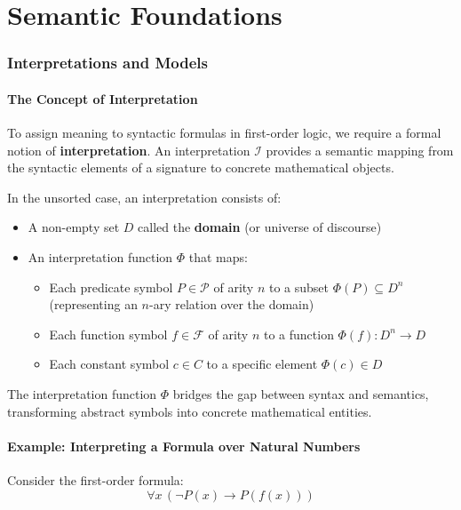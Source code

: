 \documentclass[11pt,a4paper]{article}
\theoremstyle{definition}
\theoremstyle{plain}
\theoremstyle{remark}
\begin{document}
\newpage

\part{Semantic Foundations}

\section{Interpretations and Models}

\subsection{The Concept of Interpretation}

To assign meaning to syntactic formulas in first-order logic, we require a formal notion of \textbf{interpretation}. An interpretation $\mathcal{I}$ provides a semantic mapping from the syntactic elements of a signature to concrete mathematical objects.

In the unsorted case, an interpretation consists of:
\begin{itemize}
    \item A non-empty set $D$ called the \textbf{domain} (or universe of discourse)
    \item An interpretation function $\Phi$ that maps:
    \begin{itemize}
        \item Each predicate symbol $P \in \mathcal{P}$ of arity $n$ to a subset $\Phi(P) \subseteq D^n$ (representing an $n$-ary relation over the domain)
        \item Each function symbol $f \in \mathcal{F}$ of arity $n$ to a function $\Phi(f) : D^n \rightarrow D$
        \item Each constant symbol $c \in C$ to a specific element $\Phi(c) \in D$
    \end{itemize}
\end{itemize}

The interpretation function $\Phi$ bridges the gap between syntax and semantics, transforming abstract symbols into concrete mathematical entities.

\subsection{Example: Interpreting a Formula over Natural Numbers}

Consider the first-order formula:
\[
\forall x \, (\neg P(x) \rightarrow P(f(x)))
\]
\end{document}
